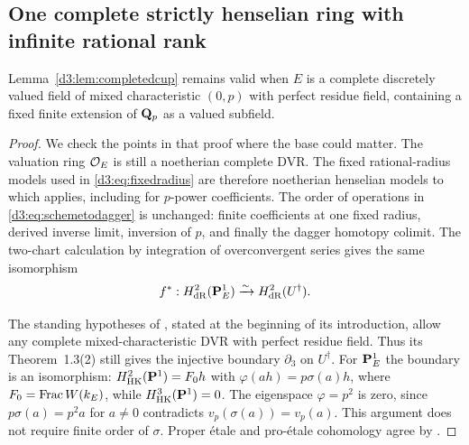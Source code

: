 \subsection{One complete strictly henselian ring with infinite rational rank}

\begin{lemma}\label{d3:lem:completedcupperfect}
Lemma~\ref{d3:lem:completedcup} remains valid when $E$ is a complete
discretely valued field of mixed characteristic $(0,p)$ with perfect
residue field, containing a fixed finite extension of $\mathbf Q_p$ as a valued
subfield.
\end{lemma}
\begin{proof}
We check the points in that proof where the base could matter.
The valuation ring $\mathcal O_E$ is still a noetherian complete DVR.
The fixed rational-radius models used in \eqref{d3:eq:fixedradius}
are therefore noetherian henselian models to which
\cite[Theorem~6.2.1]{Achinger} applies, including for $p$-power coefficients.
The order of operations in \eqref{d3:eq:schemetodagger} is unchanged:
finite coefficients at one fixed radius, derived inverse limit,
inversion of $p$, and finally the dagger homotopy colimit.
The two-chart calculation by integration of overconvergent series gives
the same isomorphism
\[
 f^*:H^2_{\mathrm{dR}}(\mathbf P^1_E)
       \xrightarrow{\sim}H^2_{\mathrm{dR}}(U^\dagger).
\]

The standing hypotheses of \cite{ColmezNiziol}, stated at the beginning
of its introduction, allow any complete mixed-characteristic DVR with
perfect residue field. Thus its Theorem~1.3(2) still gives the injective
boundary $\partial_3$ on $U^\dagger$.
For $\mathbf P^1_E$ the boundary is an isomorphism:
$H^2_{\mathrm{HK}}(\mathbf P^1)=F_0h$ with
$\varphi(ah)=p\sigma(a)h$, where
$F_0=\operatorname{Frac} W(k_E)$, while $H^3_{\mathrm{HK}}(\mathbf P^1)=0$.
The eigenspace $\varphi=p^2$ is zero, since
$p\sigma(a)=p^2a$ for $a\ne0$ contradicts
$v_p(\sigma(a))=v_p(a)$.
This argument does not require finite order of $\sigma$.
Proper \'etale and pro-\'etale cohomology agree by
\cite[Section~7.2.4]{ColmezNiziol}.


\end{proof}
